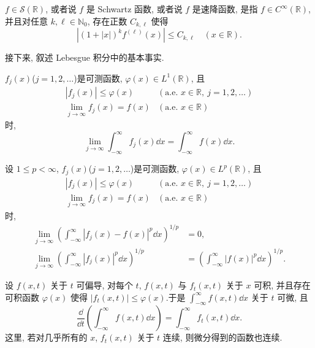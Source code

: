 \begin{definition}\label{def:1.1.1}
$f \in \mathcal{S}(\mathbb{R})$, 或者说 $f$ 是 Schwartz 函数, 或者说 $f$ 是速降函数, 是指 $f \in C^{\infty}(\mathbb{R})$, 并且对任意 $k, \ell \in \mathbb{N}_0$, 存在正数 $C_{k,\ell}$ 使得
\begin{equation*}
\left| (1 + |x|)^{k} f^{(\ell)}(x) \right| \leq C_{k,\ell} \quad (x \in \mathbb{R}).
\end{equation*}
\end{definition}

接下来, 叙述 Lebesgue 积分中的基本事实.

\begin{theorem}\label{thm:1.1.2}
$f_{j}(x)$($j = 1, 2, \ldots$)是可测函数, $\varphi(x) \in L^{1}(\mathbb{R})$, 且
\begin{align*}
|f_{j}(x)| \leq \varphi(x) & (\text{a.e. } x \in \mathbb{R},\ j = 1, 2, \ldots) \\
\lim_{j \to \infty} f_{j}(x) = f(x) & (\text{a.e. } x \in \mathbb{R})
\end{align*}
时, 
\begin{equation*}
\lim_{j \rightarrow \infty} \int_{-\infty}^{\infty} f_{j}(x)\dd x = \int_{-\infty}^{\infty} f(x)\dd x.
\end{equation*}
\end{theorem}

\begin{corollary}\label{cor:1.1.3}
设 $1 \leq p < \infty$, $f_{j}(x)$($j = 1, 2, \ldots$)是可测函数, $\varphi(x) \in L^{p}(\mathbb{R})$, 且
\begin{align*}
|f_{j}(x)| \leq \varphi(x) & (\text{a.e. } x \in \mathbb{R},\ j = 1, 2, \ldots) \\
\lim_{j \to \infty} f_{j}(x) = f(x) & (\text{a.e. } x \in \mathbb{R})
\end{align*}
时, 
\begin{align*}
\lim_{j \to \infty} \left(\int_{-\infty}^{\infty} |f_{j}(x) - f(x)|^{p}\dd x\right)^{1/p} &= 0, \\
\lim_{j \to \infty} \left(\int_{-\infty}^{\infty} |f_{j}(x)|^{p}\dd x\right)^{1/p} &= \left(\int_{-\infty}^{\infty} |f(x)|^{p}\dd x\right)^{1/p}.
\end{align*}
\end{corollary}

\begin{theorem}[积分号下的微分定理]\label{thm:1.1.4}
设 $f(x,t)$ 关于 $t$ 可偏导, 对每个 $t$, $f(x,t)$ 与 $f_{t}(x,t)$ 关于 $x$ 可积, 并且存在可积函数 $\varphi(x)$ 使得 $|f_{t}(x,t)| \leq \varphi(x)$.于是 $\int_{-\infty}^{\infty} f(x,t)\dd x$ 关于 $t$ 可微, 且
\begin{equation*}
\frac{\dd}{\dd t}\left(\int_{-\infty}^{\infty} f(x,t)\dd x\right) = \int_{-\infty}^{\infty} f_{t}(x,t)\dd x.
\end{equation*}
这里, 若对几乎所有的 $x$, $f_{t}(x,t)$ 关于 $t$ 连续, 则微分得到的函数也连续.
\end{theorem}

